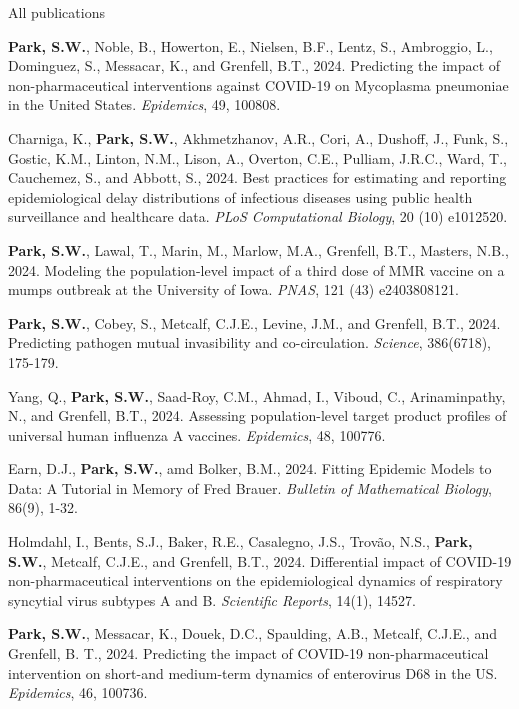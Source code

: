 \documentclass[
	11pt, %
]{resume} %
\begin{document}
\begin{rSection}{All publications}

\textbf{Park, S.W.}, Noble, B., Howerton, E., Nielsen, B.F., Lentz, S., Ambroggio, L., Dominguez, S., Messacar, K., and Grenfell, B.T., 2024. Predicting the impact of non-pharmaceutical interventions against COVID-19 on Mycoplasma pneumoniae in the United States. \textit{Epidemics}, 49, 100808.

Charniga, K., \textbf{Park, S.W.}, Akhmetzhanov, A.R., Cori, A., Dushoff, J., Funk, S., Gostic, K.M., Linton, N.M., Lison, A., Overton, C.E., Pulliam, J.R.C., Ward, T., Cauchemez, S., and Abbott, S., 2024. Best practices for estimating and reporting epidemiological delay distributions of infectious diseases using public health surveillance and healthcare data. \textit{PLoS Computational Biology}, 20 (10) e1012520.

\textbf{Park, S.W.}, Lawal, T., Marin, M., Marlow, M.A., Grenfell, B.T., Masters, N.B., 2024. Modeling the population-level impact of a third dose of MMR vaccine on a mumps outbreak at the University of Iowa. \textit{PNAS}, 121 (43) e2403808121.

\textbf{Park, S.W.}, Cobey, S., Metcalf, C.J.E., Levine, J.M., and Grenfell, B.T., 2024. Predicting pathogen mutual invasibility and co-circulation. \textit{Science}, 386(6718), 175-179.

Yang, Q., \textbf{Park, S.W.}, Saad-Roy, C.M., Ahmad, I., Viboud, C., Arinaminpathy, N., and Grenfell, B.T., 2024. Assessing population-level target product profiles of universal human influenza A vaccines. \textit{Epidemics}, 48, 100776.

Earn, D.J., \textbf{Park, S.W.}, amd Bolker, B.M., 2024. Fitting Epidemic Models to Data: A Tutorial in Memory of Fred Brauer. \textit{Bulletin of Mathematical Biology}, 86(9), 1-32.

Holmdahl, I., Bents, S.J., Baker, R.E., Casalegno, J.S., Trovão, N.S., \textbf{Park, S.W.}, Metcalf, C.J.E., and Grenfell, B.T., 2024. Differential impact of COVID-19 non-pharmaceutical interventions on the epidemiological dynamics of respiratory syncytial virus subtypes A and B. \textit{Scientific Reports}, 14(1), 14527.

\textbf{Park, S.W.}, Messacar, K., Douek, D.C., Spaulding, A.B., Metcalf, C.J.E., and Grenfell, B. T., 2024. Predicting the impact of COVID-19 non-pharmaceutical intervention on short-and medium-term dynamics of enterovirus D68 in the US. \textit{Epidemics}, 46, 100736.


\end{rSection}
\end{document}
